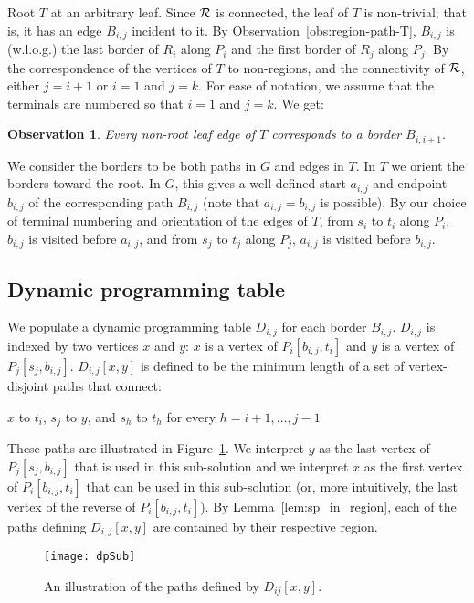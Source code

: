 \documentclass[11pt,twoside]{article}
\newtheorem{observation}[theorem]{Observation}
\newcommand{\spath}[1]{P_{#1}}
\newcommand{\border}[2]{B_{#1,#2}}
\begin{document}
Root $T$ at an arbitrary leaf.  Since $\cal R$ is connected, the leaf of $T$ is non-trivial; that is, it has an edge $B_{i,j}$ incident to it.  By Observation~\ref{obs:region-path-T}, $B_{i,j}$ is (w.l.o.g.) the last border of $R_i$ along $P_i$ and the first border of $R_j$ along $P_j$.  By the correspondence of the vertices of $T$ to non-regions, and the connectivity of $\cal R$, either $j = i+1$ or $i = 1$ and $j = k$.
For ease of notation, we assume that the terminals are numbered so that $i = 1$ and $j = k$.  We get:
\begin{observation}\label{obs:leaf-edge}
  Every non-root leaf edge of $T$ corresponds to a border $B_{i,i+1}$.
\end{observation}

We consider the borders to be both paths in $G$ and edges in $T$. In $T$ we orient the borders toward the root.  In $G$, this gives a well defined start $a_{i,j}$ and endpoint $b_{i,j}$ of the corresponding path $B_{i,j}$ (note that $a_{i,j} = b_{i,j}$ is possible).  By our choice of terminal numbering and orientation of the edges of $T$, from $s_i$ to $t_i$ along $\spath{i}$, $b_{i,j}$ is visited before $a_{i,j}$, and from $s_j$ to $t_j$ along $\spath{j}$, $a_{i,j}$ is visited before $b_{i,j}$.

\subsection{Dynamic programming table}
We populate a dynamic programming table $D_{i,j}$ for each border $\border{i}{j}$.  $D_{i,j}$ is indexed by two vertices $x$ and $y$: $x$ is a vertex of $\spath{i}[b_{i,j},t_i]$  and $y$ is a vertex of $\spath{j}[s_j,b_{i,j}]$.  $D_{i,j}[x,y]$ is defined to be the minimum length of a set of vertex-disjoint paths that connect:
  \begin{center}
    $x$ to $t_i$, $s_j$ to $y$, and $s_h$ to $t_h$ for every $h = i+1,
    \ldots, j-1$
  \end{center}
These paths are illustrated in Figure~\ref{fig:dp-table}.
We interpret $y$ as the last vertex of $\spath{j}[s_j,b_{i,j}]$ that is used in this sub-solution and we interpret $x$ as the first vertex of $\spath{i}[b_{i,j},t_i]$ that can be used in this sub-solution (or, more intuitively, the last vertex of the reverse of $\spath{i}[b_{i,j},t_i]$).  By Lemma~\ref{lem:sp_in_region}, each of the paths defining $D_{i,j}[x,y]$ are contained by their respective region.
\begin{figure}[ht]
  \centering
    \texttt{[image: dpSub]}
  \caption{An illustration of the paths defined by $D_{ij}[x,y]$.}
  \label{fig:dp-table}
\end{figure}
\end{document}
